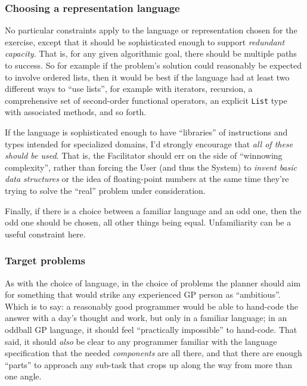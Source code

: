 \subsubsection{Choosing a representation language}\hypertarget{choosing-a-representation-language}{}\label{choosing-a-representation-language}

No particular constraints apply to the language or representation chosen for the exercise, except that it should be sophisticated enough to support \emph{redundant capacity}. That is, for any given algorithmic goal, there should be multiple paths to success.  So for example if the problem's solution could reasonably be expected to involve ordered lists, then it would be best if the language had at least two different ways to ``use lists'', for example with iterators, recursion, a comprehensive set of second-order functional operators, an explicit {\tt List} type with associated methods, and so forth.

If the language is sophisticated enough to have ``libraries'' of instructions and types intended for specialized domains, I'd strongly encourage that \emph{all of these should be used}. That is, the Facilitator should err on the side of ``winnowing complexity'', rather than forcing the User (and thus the System) to \emph{invent basic data structures} or the idea of floating-point numbers at the same time they're trying to solve the ``real'' problem under consideration.

Finally, if there is a choice between a familiar language and an odd one, then the odd one should be chosen, all other things being equal. Unfamiliarity can be a useful constraint here.

\subsubsection{Target problems}\hypertarget{target-problems}{}\label{target-problems}

As with the choice of language, in the choice of problems the planner should aim for something that would strike any experienced GP person as ``ambitious''. Which is to say: a reasonably good programmer would be able to hand-code the answer with a day's thought and work, but only in a familiar language; in an oddball GP language, it should feel ``practically impossible'' to hand-code. That said, it should \emph{also} be clear to any programmer familiar with the language specification that the needed \emph{components} are all there, and that there are enough ``parts'' to approach any sub-task that crops up along the way from more than one angle.

